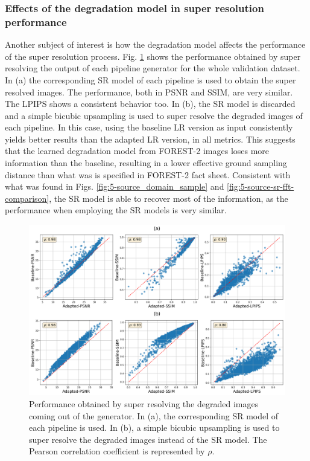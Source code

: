         \subsubsection{Effects of the degradation model in super resolution performance}

        Another subject of interest is how the degradation model affects the performance of the super resolution process.
        Fig. \ref{fig:5-source-domain-comparison} shows the performance obtained by super resolving the output of each pipeline generator for the whole validation dataset.
        In (a)  the corresponding SR model of each pipeline is used to obtain the super resolved images. 
        The performance, both in PSNR and SSIM, are very similar. The LPIPS shows a consistent behavior too.
        In (b), the SR model is discarded and a simple bicubic upsampling is used to super resolve the degraded images of each pipeline. 
        In this case, using the baseline LR version as input consistently yields better results than the adapted LR version, in all metrics.
        This suggests that the learned degradation model from FOREST-2 images loses more information than the baseline, resulting in a lower effective ground sampling distance than what was is specified in FOREST-2 fact sheet.
        Consistent with what was found in Figs. \ref{fig:5-source_domain_sample} and \ref{fig:5-source-sr-fft-comparison}, the SR model is able to recover most of the information, as the performance when employing the SR models is very similar. 
        
        \begin{figure}[H]
            \centering
            \includegraphics[width=\textwidth]{Includes/5-source-domain-comparison.png}
            \caption{Performance obtained by super resolving the degraded images coming out of the generator. 
                     In (a), the corresponding SR model of each pipeline is used. 
                     In (b), a simple bicubic upsampling is used to super resolve the degraded images instead of the SR model. The Pearson correlation coefficient is represented by $\rho$. }
            \label{fig:5-source-domain-comparison}
        \end{figure}

